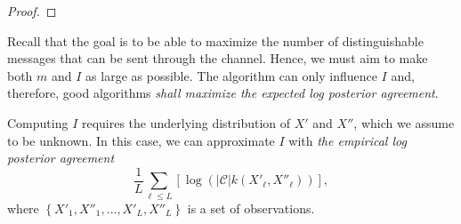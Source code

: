 \begin{proof}
\end{proof}

Recall that the goal is to be able to maximize the number of distinguishable messages that can be sent through the channel. Hence, we must aim to make both $m$ and $I$ as large as possible. The algorithm can only influence $I$ and, therefore, good algorithms \emph{shall maximize the expected log posterior agreement}.

Computing $I$ requires the underlying distribution of $X'$ and $X''$, which we assume to be unknown. In this case, we can approximate $I$ with \emph{the empirical log posterior agreement}
%
\begin{equation}
\frac{1}{L}\sum_{\ell \leq L} \left[\log \left(\left|\mathcal{C}\right|k(X'_\ell, X''_\ell)\right)\right],
\label{eq:emp_log_pa}
\end{equation}
%
where $\left\{X'_1, X''_1, \ldots, X'_L, X''_L\right\}$ is a set of observations.

